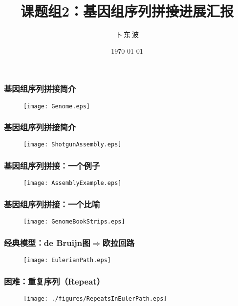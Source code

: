 \documentclass[mathserif]{beamer}
\title{课题组2：基因组序列拼接进展汇报}
\author{ 卜$\ $东$\ $波 }
\institute{中科院计算所}
\date{\today}
\begin{document}
	

	\begin{frame}
			\titlepage
	\end{frame}
	
	\begin{frame}
			\frametitle{基因组序列拼接简介}
                          \begin{figure}
				\centering
				\texttt{[image: Genome.eps]}
			\end{figure}
	\end{frame}

	\begin{frame}
			\frametitle{基因组序列拼接简介}
                          \begin{figure}
				\centering
				\texttt{[image: ShotgunAssembly.eps]}
			\end{figure}
	\end{frame}

	\begin{frame}
			\frametitle{基因组序列拼接：一个例子}
                          \begin{figure}
				\centering
				\texttt{[image: AssemblyExample.eps]}
			\end{figure}

	\end{frame}
	
	\begin{frame}
			\frametitle{基因组序列拼接：一个比喻}
                          \begin{figure}
				\centering
				\texttt{[image: GenomeBookStrips.eps]}
			\end{figure}
	\end{frame}

	\begin{frame}
		\frametitle{经典模型：de Bruijn图$\Rightarrow$欧拉回路}
                          \begin{figure}
				\centering
				\texttt{[image: EulerianPath.eps]}
			\end{figure}
		
	\end{frame}

	\begin{frame}
		\frametitle{困难：重复序列（Repeat）}
                          \begin{figure}
				\centering
				\texttt{[image: ./figures/RepeatsInEulerPath.eps]}
			\end{figure}
		
	\end{frame}
\end{document}
